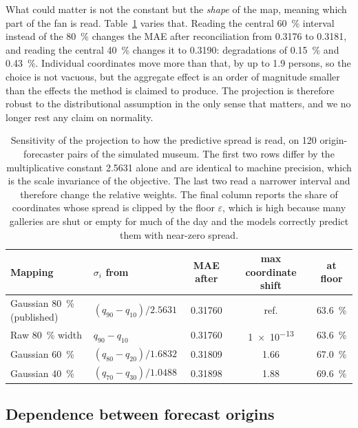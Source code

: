 \documentclass[11pt]{article}
\theoremstyle{plain}
\theoremstyle{definition}
\theoremstyle{remark}
\newif\ifrevisionmarkup
\newcommand{\new}[1]{\ifrevisionmarkup\textcolor{revision}{#1}\else#1\fi}
\begin{document}
\new{What could matter is not the constant but the \emph{shape} of the map, meaning which part of the fan is read. Table~\ref{tab:sigma} varies that. Reading the central \SI{60}{\percent} interval instead of the \SI{80}{\percent} changes the MAE after reconciliation from \num{0.3176} to \num{0.3181}, and reading the central \SI{40}{\percent} changes it to \num{0.3190}: degradations of \SI{0.15}{\percent} and \SI{0.43}{\percent}. Individual coordinates move more than that, by up to \num{1.9} persons, so the choice is not vacuous, but the aggregate effect is an order of magnitude smaller than the effects the method is claimed to produce. The projection is therefore robust to the distributional assumption in the only sense that matters, and we no longer rest any claim on normality.}

\new{\begin{table}[htbp]
\centering
\caption{\new{Sensitivity of the projection to how the predictive spread is read, on \num{120} origin-forecaster pairs of the simulated museum. The first two rows differ by the multiplicative constant \num{2.5631} alone and are identical to machine precision, which is the scale invariance of the objective. The last two read a narrower interval and therefore change the relative weights. The final column reports the share of coordinates whose spread is clipped by the floor $\varepsilon$, which is high because many galleries are shut or empty for much of the day and the models correctly predict them with near-zero spread.}}
\label{tab:sigma}
\small
\begin{tabular}{llccc}
\toprule
Mapping & $\sigma_i$ from & MAE after & max coordinate shift & at floor \\
\midrule
Gaussian \SI{80}{\percent} (published) & $(q_{90}-q_{10})/2.5631$ & 0.31760 & ref. & \SI{63.6}{\percent} \\
Raw \SI{80}{\percent} width             & $q_{90}-q_{10}$          & 0.31760 & \num{1e-13} & \SI{63.6}{\percent} \\
Gaussian \SI{60}{\percent}              & $(q_{80}-q_{20})/1.6832$ & 0.31809 & 1.66 & \SI{67.0}{\percent} \\
Gaussian \SI{40}{\percent}              & $(q_{70}-q_{30})/1.0488$ & 0.31898 & 1.88 & \SI{69.6}{\percent} \\
\bottomrule
\end{tabular}
\end{table}}

\subsection{\new{Dependence between forecast origins}}
\label{sec:depend}
\end{document}
